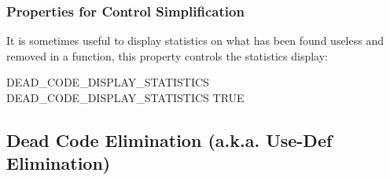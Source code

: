 \documentclass[a4paper]{report}
\begin{document}
\subsubsection{Properties for Control Simplification}

It is sometimes useful to display statistics on what has been found
useless and removed in a function, this property controls the
statistics display:
\begin{PipsProp}{DEAD_CODE_DISPLAY_STATISTICS}
DEAD_CODE_DISPLAY_STATISTICS TRUE
\end{PipsProp}


\subsection{Dead Code Elimination (a.k.a. Use-Def Elimination)}
\label{sec:use-def-elimination}
\end{document}
